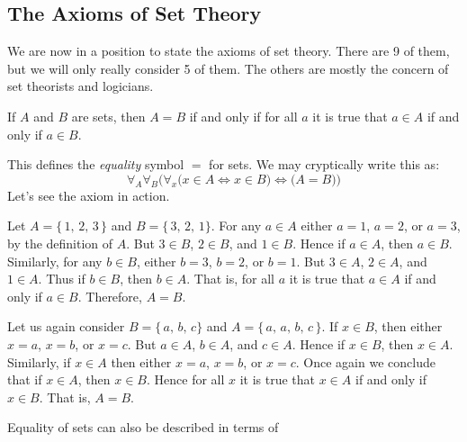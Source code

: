         \subsection{The Axioms of Set Theory}
            We are now in a position to state the axioms of set theory. There
            are 9 of them, but we will only really consider 5 of them. The
            others are mostly the concern of set theorists and logicians.
            \begin{axiom}
                If $A$ and $B$ are sets, then $A=B$ if and only if for all
                $a$ it is true that $a\in{A}$ if and only if $a\in{B}$.
            \end{axiom}
            This defines the \textit{equality} symbol $=$ for sets. We may
            cryptically write this as:
            \begin{equation}
                \forall_{A}\forall_{B}\Big(
                    \forall_{x}\big(x\in{A}\Leftrightarrow{x}\in{B}\big)
                        \Leftrightarrow\big(A=B)\Big)
            \end{equation}
            Let's see the axiom in action.
            \begin{example}
                Let $A=\{\,1,\,2,\,3\,\}$ and $B=\{\,3,\,2,\,1\}$. For any
                $a\in{A}$ either $a=1$, $a=2$, or $a=3$, by the definition of
                $A$. But $3\in{B}$, $2\in{B}$, and $1\in{B}$. Hence if
                $a\in{A}$, then $a\in{B}$. Similarly, for any $b\in{B}$,
                either $b=3$, $b=2$, or $b=1$. But $3\in{A}$, $2\in{A}$,
                and $1\in{A}$. Thus if $b\in{B}$, then $b\in{A}$. That is, for
                all $a$ it is true that $a\in{A}$ if and only if $a\in{B}$.
                Therefore, $A=B$.
            \end{example}
            \begin{example}
                Let us again consider $B=\{\,a,\,b,\,c\}$ and
                $A=\{\,a,\,a,\,b,\,c\,\}$. If $x\in{B}$, then either
                $x=a$, $x=b$, or $x=c$. But $a\in{A}$, $b\in{A}$, and $c\in{A}$.
                Hence if $x\in{B}$, then $x\in{A}$. Similarly, if $x\in{A}$ then
                either $x=a$, $x=b$, or $x=c$. Once again we conclude that if
                $x\in{A}$, then $x\in{B}$. Hence for all $x$ it is true that
                $x\in{A}$ if and only if $x\in{B}$. That is, $A=B$.
            \end{example}
            Equality of sets can also be described in terms of
